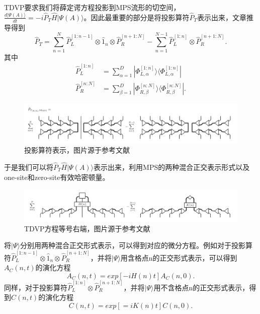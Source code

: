 \documentclass[12pt]{article}
\begin{document}
      TDVP要求我们将薛定谔方程投影到MPS流形的切空间\cite{haegeman2016unifying}，$\frac{d|\Psi(A)\rangle}{dt}=-i\hat{P}_T\hat{H}|\Psi(A)\rangle$。因此最重要的部分是将投影算符$\hat{P}_T$表示出来，文章推导得到
      \begin{equation}\hat{P}_T=\sum_{n=1}^{N}\hat{P}_L^{[1:n-1]}\otimes\hat{1}_n\otimes\hat{P}_R^{[n+1:N]}-\sum_{n=1}^{N-1}\hat{P}_L^{[1:n]}\otimes\hat{P}_R^{[n+1:N]}.\end{equation}
      其中
      \begin{equation}\begin{split}
      	\hat{P}_L^{[1:n]}&=\sum_{\alpha=1}^{D}|\Phi_{L,\alpha}^{[1:n]}\rangle\langle\Phi_{L,\alpha}^{[1:n]}|\\
      	\hat{P}_R^{[n:N]}&=\sum_{\beta=1}^{D}|\Phi_{R,\beta}^{[n:N]}\rangle\langle\Phi_{R,\beta}^{[n:N]}|.
      \end{split}\end{equation}
     
     \begin{figure}[H]
     	\centering
     	\includegraphics[scale=0.75]{13.投影算符表示}
     	\caption[9pt]{ 投影算符表示，图片源于参考文献}
     	\label{fig:13}
     \end{figure}
     
     于是我们可以将$\hat{P}_T\hat{H}|\Psi(A)\rangle$表示出来，利用MPS的两种混合正交表示形式以及one-site和zero-site有效哈密顿量。
     \begin{figure}[H]
     	\centering
     	\includegraphics[scale=0.75]{14.TDVP方程等号右端}
     	\caption[9pt]{ TDVP方程等号右端，图片源于参考文献}
     	\label{fig:14}
     \end{figure}
     将$|\Psi\rangle$分别用两种混合正交形式表示，可以得到对应的微分方程。例如对于投影算符$\hat{P}_L^{[1:n-1]}\otimes\hat{1}_n\otimes\hat{P}_R^{[n+1:N]}$，并将$|\Psi\rangle$用含格点n的正交形式表示，可以得到$A_C(n,t)$的演化方程
     \begin{equation}A_C(n,t)=exp[-iH(n)t]A_C(n,0).\end{equation}
     同样，对于投影算符$\hat{P}_L^{[1:n]}\otimes\hat{P}_R^{[n+1:N]}$，并将$|\Psi\rangle$用不含格点n的正交形式表示，得到$C(n,t)$的演化方程
     \begin{equation}C(n,t)=exp[=iK(n)t]C(n,0).\end{equation}
     
\end{document}
